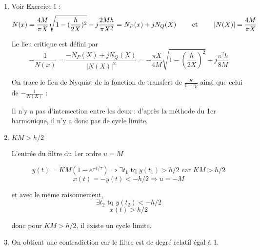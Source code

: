 \documentclass{../../td}{subfiles}
\begin{document}
\begin{enumerate}\setlength{\itemsep}{1cm}

\item Voir Exercice I :
\[ N(x) = \frac{4M}{\pi X}\sqrt{1-(\frac{h}{2X})^2} - j\frac{2Mh}{\pi X^2} = N_P(x) + jN_Q(X) \quad \quad\text{ et }\quad \quad |N(X)| = \frac{4M}{\pi X}\]

Le lieu critique est défini par 
\[ - \frac{1}{N(x)} = \frac{-N_P(X) + j N_Q(X)}{|N(X)|^2} = -\frac{\pi X}{4M}\sqrt{1-(\frac{h}{2X})^2} - j\frac{\pi^2h}{8M} \]

On trace le lieu de Nyquist de la fonction de transfert de $\frac{K}{1+\tau p}$ ainsi que celui de $-\frac{1}{N(X)}$ :


Il n'y a pas d'intersection entre les deux : d'après la méthode du 1er harmonique, il n'y a donc pas de cycle limite.

\item $KM > h/2$

L'entrée du filtre du 1er ordre $u=M$

\[y(t) = KM(1-e^{-t/\tau}) \Rightarrow \exists t_1 \text{ tq } y(t_1) > h/2 \text{ car } KM>h/2 \]
\[x(t) = -y(t) < -h/2 \Rightarrow u = -M\]

et avec le même raisonnement,
\[ \exists t_2 \text{ tq } y(t_2) < -h/2 \]
\[ x(t) > h/2 \]

donc pour $KM>h/2$, il existe un cycle limite.

\item On obtient une contradiction car le filtre est de degré relatif égal à 1.
\end{enumerate}
\end{document}
